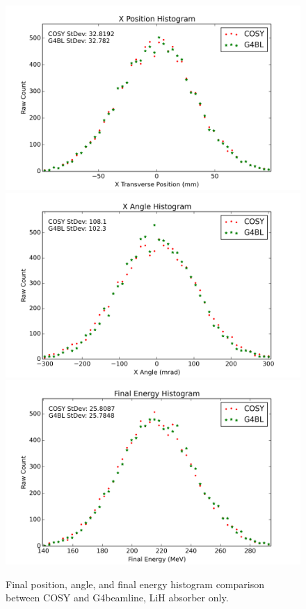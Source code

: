 \documentclass{jacow}
\begin{document}
\begin{figure}[!ht]
\centering
\includegraphics[width=\columnwidth]{LiH_xposition.png}
\includegraphics[width=\columnwidth]{LiH_xangle.png}
\includegraphics[width=\columnwidth]{LiH_energy.png}
\caption{Final position, angle, and final energy histogram comparison between COSY and G4beamline, LiH absorber only.}
\label{fig:mice_coil_absorber}
\end{figure}
\end{document}
